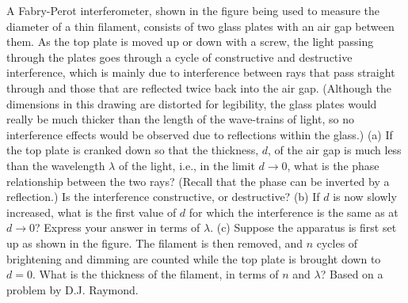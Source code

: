 A Fabry-Perot interferometer, shown in the figure being used
to measure the diameter of a thin filament, consists of two glass plates
with an air gap between them. As the top plate is moved up or down
with a screw, the light passing through the plates goes through a cycle
of constructive and destructive interference, which is mainly due to
interference between rays that pass straight through and those that are
reflected twice back into the air gap. (Although the dimensions in this
drawing are distorted for legibility, the glass plates would really be much
thicker than the length of the wave-trains of light, so no interference
effects would be observed due to reflections within the glass.)\hwendpart
(a) If the top plate is cranked down so that the thickness, $d$, of
the air gap is much less than the wavelength $\lambda$ of the light, i.e., in the
limit $d \rightarrow 0$,
what is the phase relationship between the two
rays? (Recall that the phase can be inverted by a reflection.) 
Is the interference constructive, or destructive?\hwendpart
(b) If $d$ is now slowly increased, what is the first value of $d$
for which the interference is the same as at $d\rightarrow 0$? Express your
answer in terms of $\lambda$.\hwendpart
(c) Suppose the apparatus is first set up as shown in the figure. The
filament is then removed, and $n$ cycles of brightening and dimming
are counted while the top plate is brought down to $d=0$. What is the
thickness of the filament, in terms of $n$ and $\lambda$?\hwendpart
Based on a problem by D.J. Raymond.
